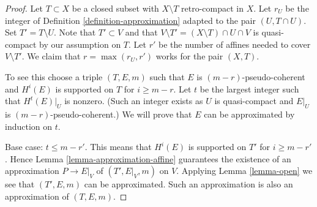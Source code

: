 \documentclass{amsart}
\theoremstyle{plain}
\theoremstyle{definition}
\theoremstyle{remark}
\numberwithin{equation}{subsection}
\begin{document}
\begin{proof}
Let $T \subset X$ be a closed subset with $X \setminus T$ retro-compact
in $X$. Let $r_U$ be the integer of Definition \ref{definition-approximation}
adapted to the pair $(U, T \cap U)$.
Set $T' = T \setminus U$. Note that
$T' \subset V$ and that $V \setminus T' = (X \setminus T) \cap U \cap V$
is quasi-compact by our assumption on $T$.
Let $r'$ be the number of affines needed to cover $V \setminus T'$.
We claim that $r = \max(r_U, r')$ works for the pair $(X, T)$.

\medskip\noindent
To see this choose a triple $(T, E, m)$ such that $E$ is
$(m - r)$-pseudo-coherent and $H^i(E)$ is supported on $T$ for
$i \geq m - r$. Let $t$ be the largest integer such that
$H^t(E)|_U$ is nonzero. (Such an integer exists as $U$ is quasi-compact
and $E|_U$ is $(m - r)$-pseudo-coherent.)
We will prove that $E$ can be approximated by induction on $t$.

\medskip\noindent
Base case: $t \leq m - r'$. This means that $H^i(E)$ is supported
on $T'$ for $i \geq m - r'$. Hence
Lemma \ref{lemma-approximation-affine}
guarantees the existence of an approximation
$P \to E|_V$ of $(T', E|_V, m)$ on $V$.
Applying Lemma \ref{lemma-open} we see that
$(T', E, m)$ can be approximated. Such an approximation
is also an approximation of $(T, E, m)$.


\end{proof}
\end{document}
